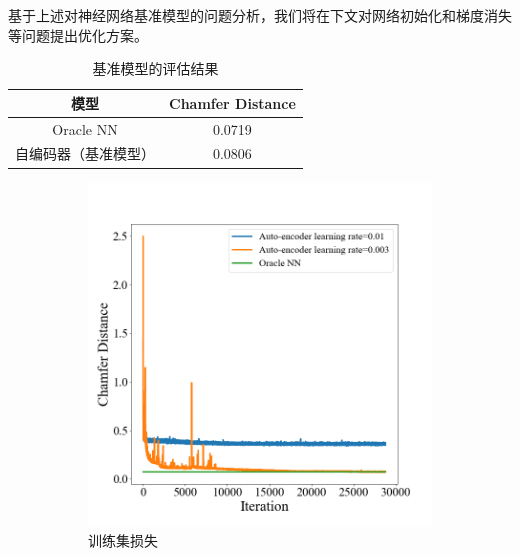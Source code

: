 \documentclass[bachelor, nocolorlinks, printoneside]{seuthesis} %
\begin{document}
\begin{Main}
基于上述对神经网络基准模型的问题分析，我们将在下文对网络初始化和梯度消失等问题提出优化方案。
\begin{table}
    \centering
    \caption{基准模型的评估结果}
    \label{table:metric_per_baseline}
    \begin{tabular}{cc} 
    \hline
    模型         & Chamfer Distance        \\ 
    \hline
    Oracle NN  & 0.0719                  \\
    自编码器（基准模型） & 0.0806 \\
    \hline
    \end{tabular}
\end{table}

\begin{figure}[!htb]
    \centering
       \begin{subfigure}[t]{0.49\linewidth} \centering 
         \includegraphics[width=\columnwidth]{figs/model/ae_trainingloss.png}
         \caption{训练集损失}\label{fig:trainingloss}
       \end{subfigure}
      \begin{subfigure}[t]{0.49\linewidth} \centering

\end{subfigure}
\end{figure}
\end{Main}
\end{document}

